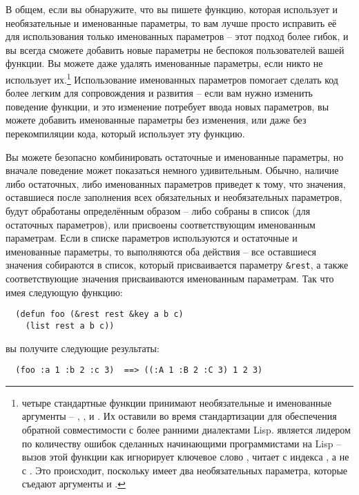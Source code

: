 В общем, если вы обнаружите, что вы пишете функцию, которая использует и необязательные и
именованные параметры, то вам лучше просто исправить её для использования только
именованных параметров -- этот подход более гибок, и вы всегда сможете добавить новые
параметры не беспокоя пользователей вашей функции.  Вы можете даже удалять именованные
параметры, если никто не использует их.\footnote{четыре стандартные функции принимают
  необязательные и именованные аргументы -- ,
  ,  и .  Их оставили во время
  стандартизации для обеспечения обратной совместимости с более ранними диалектами Lisp.
   является лидером по количеству ошибок сделанных начинающими
  программистами на Lisp -- вызов этой функции как 
  игнорирует ключевое слово , читает с индекса , а не с .
  Это происходит, поскольку  имеет два необязательных параметра,
  которые съедают аргументы  и .}  Использование именованных
параметров помогает сделать код более легким для сопровождения и развития -- если вам
нужно изменить поведение функции, и это изменение потребует ввода новых параметров, вы
можете добавить именованные параметры без изменения, или даже без перекомпиляции кода,
который использует эту функцию.

Вы можете безопасно комбинировать остаточные и именованные параметры, но вначале поведение
может показаться немного удивительным.  Обычно, наличие либо остаточных, либо именованных
параметров приведет к тому, что значения, оставшиеся после заполнения всех обязательных и
необязательных параметров, будут обработаны определённым образом -- либо собраны в список
(для остаточных параметров), или присвоены соответствующим именованным параметрам. Если в
списке параметров используются и остаточные и именованные параметры, то выполняются оба
действия -- все оставшиеся значения собираются в список, который присваивается параметру
\lstinline!&rest!, а также соответствующие значения присваиваются именованным параметрам.
Так что имея следующую функцию:

\begin{lstlisting}
  (defun foo (&rest rest &key a b c) 
    (list rest a b c))
\end{lstlisting}

вы получите следующие результаты:

\begin{verbatim}
  (foo :a 1 :b 2 :c 3)  ==> ((:A 1 :B 2 :C 3) 1 2 3)
\end{verbatim}


